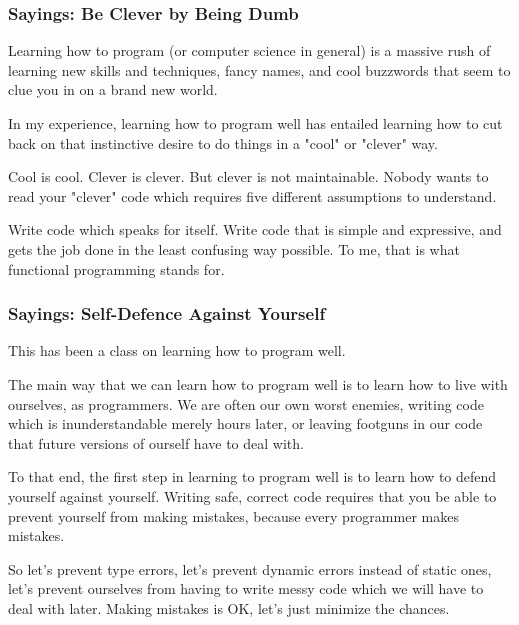 \documentclass[aspectratio=169, handout]{beamer}
\begin{document}
\begin{frame}[fragile]
  \frametitle{Sayings: Be Clever by Being Dumb}

  Learning how to program (or computer science in general) is a massive
  rush of learning new skills and techniques, fancy names, and cool buzzwords
  that seem to clue you in on a brand new world.

  \pause
  \vspace{\fill}

  In my experience, learning how to program well has entailed learning how to
  cut back on that instinctive desire to do things in a "cool" or "clever" way.

  \pause
  \vspace{\fill}

  Cool is cool. Clever is clever. But clever is not maintainable. Nobody
  wants to read your "clever" code which requires five different assumptions
  to understand.

  \pause
  \vspace{\fill}

  Write code which speaks for itself. Write code that is simple and expressive,
  and gets the job done in the least confusing way possible. To me, that is
  what functional programming stands for.
\end{frame}

\begin{frame}[fragile]
  \frametitle{Sayings: Self-Defence Against Yourself}

  This has been a class on learning how to program well.

  \pause
  \vspace{\fill}

  The main way that we can learn how to program well is to learn how to
  live with ourselves, as programmers. We are often our own worst enemies,
  writing code which is inunderstandable merely hours later, or leaving
  footguns in our code that future versions of ourself have to deal with.

  \pause
  \vspace{\fill}

  To that end, the first step in learning to program well is to learn how to
  defend yourself against yourself. Writing safe, correct code requires that
  you be able to prevent yourself from making mistakes, because every programmer
  makes mistakes.

  \pause
  \vspace{\fill}

  So let's prevent type errors, let's prevent dynamic errors instead of static ones,
  let's prevent ourselves from having to write messy code which we will have to
  deal with later. Making mistakes is OK, let's just minimize the chances.
\end{frame}
\end{document}
